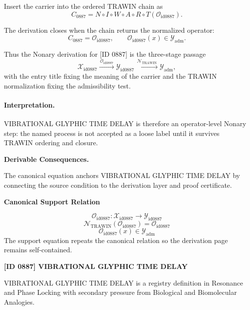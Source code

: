 Insert the carrier into the ordered TRAWIN chain as\[
C_{0887}=N\circ I\circ W\circ A\circ R\circ T(\mathcal{O}_{\mathrm{id0887}}).
\]

The derivation closes when the chain returns the normalized operator:\[
C_{0887}=\mathcal{O}_{\mathrm{id0887}},\qquad \mathcal{O}_{\mathrm{id0887}}(x)\in\mathcal{Y}_{\mathrm{adm}}.
\]

Thus the Nonary derivation for [ID 0887] is the three-stage passage
\[
\mathcal{X}_{\mathrm{id0887}}\xrightarrow{\,\mathcal{O}_{\mathrm{id0887}}\,} \mathcal{Y}_{\mathrm{id0887}}\xrightarrow{\,\mathcal{N}_{\mathrm{TRAWIN}}\,} \mathcal{Y}_{\mathrm{adm}},
\]
with the entry title fixing the meaning of the carrier and the TRAWIN normalization fixing the admissibility test.

\paragraph{Interpretation.} VIBRATIONAL GLYPHIC TIME DELAY is therefore an operator-level Nonary step: the named process is not accepted as a loose label until it survives TRAWIN ordering and closure.

\par\vspace{0.35em}
\noindent\textbf{Derivable Consequences.}\quad
\begingroup
\footnotesize
\raggedright
The canonical equation anchors VIBRATIONAL GLYPHIC TIME DELAY by connecting the source condition to the derivation layer and proof certificate.
\par\endgroup

\noindent\textbf{Canonical Support Relation}\par
\[
\mathcal{O}_{\mathrm{id0887}}:\mathcal{X}_{\mathrm{id0887}}\longrightarrow\mathcal{Y}_{\mathrm{id0887}}
\]
\[
\mathcal{N}_{\mathrm{TRAWIN}}(\mathcal{O}_{\mathrm{id0887}})=\mathcal{O}_{\mathrm{id0887}}
\]
\[
\mathcal{O}_{\mathrm{id0887}}(x)\in\mathcal{Y}_{\mathrm{adm}}
\]
\noindent The support equation repeats the canonical relation so the derivation page remains self-contained.\par

\clearpage
\noindent\textbf{[ID 0887] VIBRATIONAL GLYPHIC TIME DELAY}\par
\vspace{0.35em}
\begingroup\small
{}
VIBRATIONAL GLYPHIC TIME DELAY is a registry definition in Resonance and Phase Locking with secondary pressure from Biological and Biomolecular Analogies.

